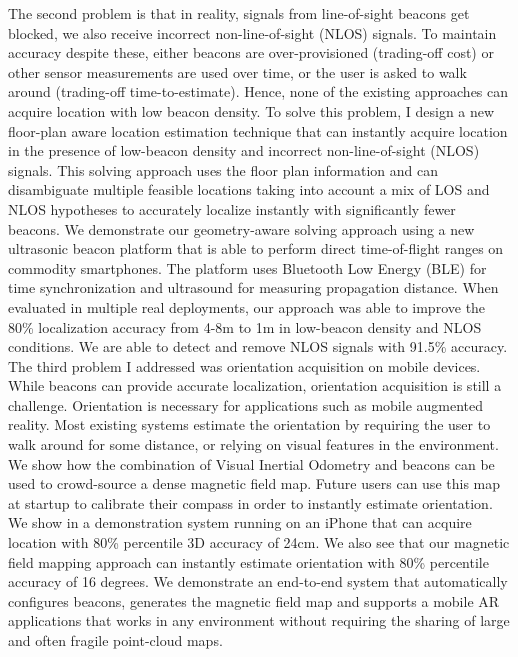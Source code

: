 \documentclass[10pt]{article}
\begin{document}
The second problem is that in reality, signals from line-of-sight beacons get blocked, we also receive incorrect non-line-of-sight (NLOS) signals. To maintain accuracy despite these, either beacons are over-provisioned (trading-off cost) or other sensor measurements are used over time, or the user is asked to walk around (trading-off time-to-estimate). Hence, none of the existing approaches can acquire location with low beacon density. To solve this problem, I design a new floor-plan aware location estimation technique that can instantly acquire location  
in the presence of low-beacon density and incorrect non-line-of-sight (NLOS) signals. 
This solving approach uses the floor plan information and can disambiguate multiple feasible locations taking into account a mix of LOS and NLOS hypotheses to accurately localize instantly with significantly fewer beacons. We demonstrate our geometry-aware solving approach using a new ultrasonic beacon platform that is able to perform direct time-of-flight ranges on commodity smartphones. The platform uses Bluetooth Low Energy (BLE) for time synchronization and ultrasound for measuring propagation distance. When evaluated in multiple real deployments, our approach was able to improve the 80\% localization accuracy from 4-8m to 1m in low-beacon density and NLOS conditions. We are able to detect and remove NLOS signals with 91.5\% accuracy.\\

The third problem I addressed was orientation acquisition on mobile devices. While beacons can provide accurate localization, orientation acquisition is still a challenge. Orientation is necessary for applications such as mobile augmented reality. Most existing systems estimate the orientation by requiring the user to walk around for some distance, or relying on visual features in the environment.  %
We show how the combination of Visual Inertial Odometry and beacons can be used to crowd-source a dense magnetic field map. Future users can use this map at startup to calibrate their compass in order to instantly estimate orientation. We show in a demonstration system running on an iPhone that can acquire location with 80\% percentile 3D accuracy of 24cm. We also see that our magnetic field mapping approach can instantly estimate orientation with 80\% percentile accuracy of 16 degrees.  We demonstrate an end-to-end system that automatically configures beacons, generates the magnetic field map and supports a mobile AR applications that works in any environment without requiring the sharing of large and often fragile point-cloud maps. \\
\end{document}
